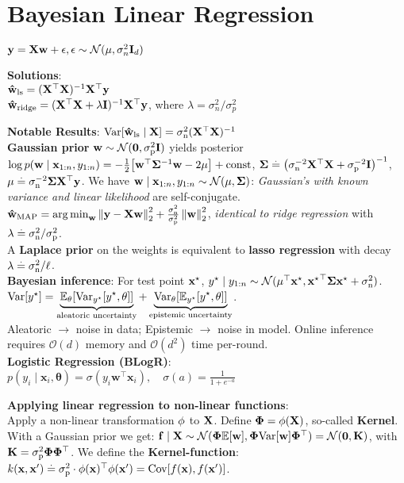 \section{Bayesian Linear Regression}
\(\vy=\mX\vw+\vepsilon, \vepsilon\sim\N{\vmu}{\sigma_n^2 \mI_d}\)
\begin{framed}
    \textbf{Solutions}:\\
    $\vwhat_{\ls} = \inv{(\transpose{\mX} \mX)} \transpose{\mX} \vy$  \\
    $\vwhat_{\ridge} = \inv{(\transpose{\mX} \mX + \lambda \mI)} \transpose{\mX} \vy$, where \(\lambda=\sigma_n^2/\sigma_p^2\)
\end{framed}
\textbf{Notable Results}: $\Var{\vwhat_{\ls} \mid \rX} = \sigman^2(\transpose{\rX}\rX)^{-1}$ \\
\textbf{Gaussian prior} $\vw \sim \N{\vzero}{\sigmap^2 \mI}$ yields posterior $\log p(\vw \mid \vx_{1:n}, y_{1:n}) = -\frac{1}{2} \brackets*{\transpose{\vw}\mSigma^{-1}\vw - 2\vmu} + \const$, $\mSigma \defeq \inv{\parentheses*{\sigman^{-2} \transpose{\mX} \mX + \sigmap^{-2} \mI}}$, $\vmu \defeq \sigman^{-2} \mSigma \transpose{\mX} \vy$. We have $\vw \mid \vx_{1:n}, y_{1:n} \sim \N{\vmu}{\mSigma}$: \textit{Gaussian's with known variance and linear likelihood} are self-conjugate. \\
$\vwhat_\MAP = \argmin_\vw \norm{\vy - \mX \vw}_2^2 + \frac{\sigman^2}{\sigmap^2} \norm{\vw}_2^2$, \textit{identical to ridge regression} with $\lambda \defeq \sigman^2 / \sigmap^2$. \\
A \textbf{Laplace prior} on the weights is equivalent to \textbf{lasso regression} with decay ${\lambda \defeq \sigman^2 / \ell}$. \\
\textbf{Bayesian inference}: For test point $\vxs$, $\ys\mid  y_{1:n} \sim \N{\transpose{\vmu} \vxs}{\transpose{\vxs} \mSigma \vxs + \sigman^2}$. \\
$\Var{\ys} = \underbrace{\E[\vtheta]{\Var[\ys]{\ys, \vtheta}}}_{\text{aleatoric uncertainty}} + \underbrace{\Var[\vtheta]{\E[\ys]{\ys, \vtheta}}}_{\text{epistemic uncertainty}}$.\\
Aleatoric $\rightarrow$ noise in data; Epistemic $\rightarrow$ noise in model.
Online inference requires \(\mathcal{O}(d)\) memory and \(\mathcal{O}(d^2)\) time per-round.\\
\textbf{Logistic Regression (BLogR)}:\\
$p(y_i \mid \mathbf{x}_i, \boldsymbol{\theta}) = \sigma(y_i \mathbf{w}^\top \mathbf{x}_i), \quad \sigma(a) = \frac{1}{1 + e^{-a}}$
\begin{framed}
    \textbf{Applying linear regression to non-linear functions}:\\
    Apply a non-linear transformation $\vphi$ to $\rX$. Define $\mPhi = \vphi(\rX)$, so-called \textbf{Kernel}. With a Gaussian prior we get: $\vf \mid \mX \sim \N{\mPhi \E{\vw}}{\mPhi \Var{\vw} \transpose{\mPhi}} = \N{\vzero}{\mK}$, with $\mK = \sigmap^2 \mPhi \transpose{\mPhi}$. We define the \textbf{Kernel-function}: $k(\vx, \vxp) \defeq \sigmap^2 \cdot \transpose{\vphi(\vx)} \vphi(\vxp) = \Cov{f(\vx), f(\vxp)}$.
\end{framed}
